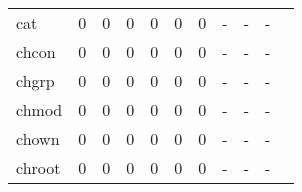 \begin{longtable}{lp{1.20cm}p{1.20cm}p{1.20cm}p{1.20cm}p{1.20cm}p{1.20cm}p{1.20cm}p{1.20cm}p{1.20cm}p{1.20cm}}
cat       &                                     0 &                                                  0 &                                                  0 &                                                  0 &                                                  0 &                                                  0 &                                             - &                                                  - &                                                  - \\
chcon     &                                     0 &                                                  0 &                                                  0 &                                                  0 &                                                  0 &                                                  0 &                                             - &                                                  - &                                                  - \\
chgrp     &                                     0 &                                                  0 &                                                  0 &                                                  0 &                                                  0 &                                                  0 &                                             - &                                                  - &                                                  - \\
chmod     &                                     0 &                                                  0 &                                                  0 &                                                  0 &                                                  0 &                                                  0 &                                             - &                                                  - &                                                  - \\
chown     &                                     0 &                                                  0 &                                                  0 &                                                  0 &                                                  0 &                                                  0 &                                             - &                                                  - &                                                  - \\
chroot    &                                     0 &                                                  0 &                                                  0 &                                                  0 &                                                  0 &                                                  0 &                                             - &                                                  - &                                                  - \\

\end{longtable}
